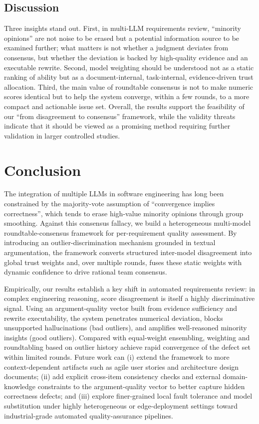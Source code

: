 \documentclass[sn-mathphys-num]{sn-jnl}
\begin{document}
\subsection{Discussion}

Three insights stand out. First, in multi-LLM requirements review, ``minority opinions'' are not noise to be erased but a potential information source to be examined further; what matters is not whether a judgment deviates from consensus, but whether the deviation is backed by high-quality evidence and an executable rewrite. Second, model weighting should be understood not as a static ranking of ability but as a document-internal, task-internal, evidence-driven trust allocation. Third, the main value of roundtable consensus is not to make numeric scores identical but to help the system converge, within a few rounds, to a more compact and actionable issue set. Overall, the results support the feasibility of our ``from disagreement to consensus'' framework, while the validity threats indicate that it should be viewed as a promising method requiring further validation in larger controlled studies.

\FloatBarrier
\section{Conclusion}\label{sec:conclusion}
The integration of multiple LLMs in software engineering has long been constrained by the majority-vote assumption of ``convergence implies correctness'', which tends to erase high-value minority opinions through group smoothing. Against this consensus fallacy, we build a heterogeneous multi-model roundtable-consensus framework for per-requirement quality assessment. By introducing an outlier-discrimination mechanism grounded in textual argumentation, the framework converts structured inter-model disagreement into global trust weights and, over multiple rounds, fuses these static weights with dynamic confidence to drive rational team consensus.

Empirically, our results establish a key shift in automated requirements review: in complex engineering reasoning, score disagreement is itself a highly discriminative signal. Using an argument-quality vector built from evidence sufficiency and rewrite executability, the system penetrates numerical deviation, blocks unsupported hallucinations (bad outliers), and amplifies well-reasoned minority insights (good outliers). Compared with equal-weight ensembling, weighting and roundtabling based on outlier history achieve rapid convergence of the defect set within limited rounds. Future work can (i) extend the framework to more context-dependent artifacts such as agile user stories and architecture design documents; (ii) add explicit cross-item consistency checks and external domain-knowledge constraints to the argument-quality vector to better capture hidden correctness defects; and (iii) explore finer-grained local fault tolerance and model substitution under highly heterogeneous or edge-deployment settings toward industrial-grade automated quality-assurance pipelines.
\end{document}
